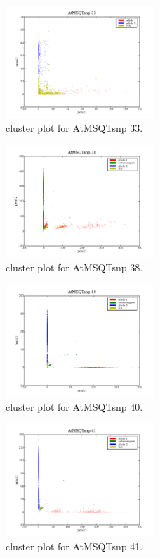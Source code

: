\begin{figure}[H]
\includegraphics[width=0.5\textwidth]{figures/cluster_plot_AtMSQTsnp_33.png}
\caption{cluster plot for AtMSQTsnp 33.} \label{flAtMSQTsnp33}
\end{figure}

\begin{figure}[H]
\includegraphics[width=0.5\textwidth]{figures/cluster_plot_AtMSQTsnp_38.png}
\caption{cluster plot for AtMSQTsnp 38.} \label{flAtMSQTsnp38}
\end{figure}

\begin{figure}[H]
\includegraphics[width=0.5\textwidth]{figures/cluster_plot_AtMSQTsnp_40.png}
\caption{cluster plot for AtMSQTsnp 40.} \label{flAtMSQTsnp40}
\end{figure}

\begin{figure}[H]
\includegraphics[width=0.5\textwidth]{figures/cluster_plot_AtMSQTsnp_41.png}
\caption{cluster plot for AtMSQTsnp 41.} \label{flAtMSQTsnp41}
\end{figure}

